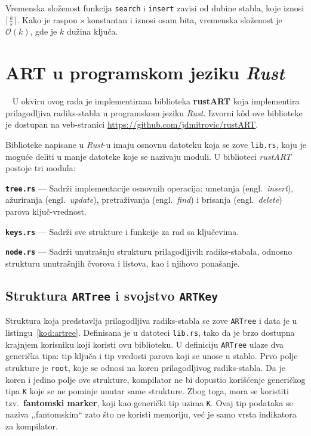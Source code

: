 \documentclass[12pt,oneside]{memoir}
\begin{document}
Vremenska složenost funkcija \texttt{search} i \texttt{insert}
zavisi od dubine stabla, koje iznosi
$ \lceil \frac{k}{s} \rceil $. Kako je raspon $s$ konstantan i
iznosi osam bita, vremenska složenost je
$ \mathcal{O}(k) $, gde je $k$ dužina ključa.

\chapter{ART u programskom jeziku \textit{Rust}}~\label{ch:rustART}
U okviru ovog rada je implementirana biblioteka \textbf{rustART}
koja implementira prilagodljiva radiks-stabla u programskom
jeziku \textit{Rust}. Izvorni kôd ove biblioteke je dostupan na
veb-stranici \url{https://github.com/jdmitrovic/rustART}.

Biblioteke napisane u \textit{Rust}-u
imaju osnovnu datoteku koja se zove \texttt{lib.rs},
koju je moguće deliti u manje datoteke koje se nazivaju
moduli. U biblioteci \textit{rustART} postoje
tri modula:

\begin{description}
  \item{\textbf{\texttt{tree.rs}}} --- Sadrži implementacije osnovnih operacija:
        umetanja (engl.\ \textit{insert}), ažuriranja (engl.\ \textit{update}),
        pretraživanja (engl.\ \textit{find}) i brisanja (engl.\ \textit{delete})
        parova ključ-vrednost.

  \item{\textbf{\texttt{keys.rs}}} --- Sadrži sve strukture i funkcije za rad sa ključevima.

  \item{\textbf{\texttt{node.rs}}} --- Sadrži unutrašnju strukturu prilagodljivih
        radiks-stabala, odnosno strukturu unutrašnjih čvorova i listova,
        kao i njihovo ponašanje.
\end{description}


\section{Struktura \texttt{ARTree} i svojstvo \texttt{ARTKey}}
Struktura koja predstavlja prilagodljiva radiks-stabla se zove \texttt{ARTree}
i data je u listingu~\ref{kod:artree}. Definisana je u datoteci \texttt{lib.rs},
tako da je brzo dostupna krajnjem korisniku koji koristi ovu biblioteku.
U definiciju \texttt{ARTree} ulaze dva generička tipa: tip ključa i tip vredosti
parova koji se unose u stablo. Prvo polje strukture je \texttt{root}, koje se odnosi
na koren prilagodljivog radiks-stabla. Da je koren i jedino polje ove strukture,
kompilator ne bi dopustio korišćenje generičkog tipa \texttt{K} koje se ne pominje
unutar same strukture. Zbog toga, mora se koristiti tzv.\ \textbf{fantomski marker},
koji kao generički tip uzima \texttt{K}. Ovaj tip podataka se naziva ,,fantomskim``
zato što ne koristi memoriju, već je samo vrsta indikatora za kompilator.
\end{document}
